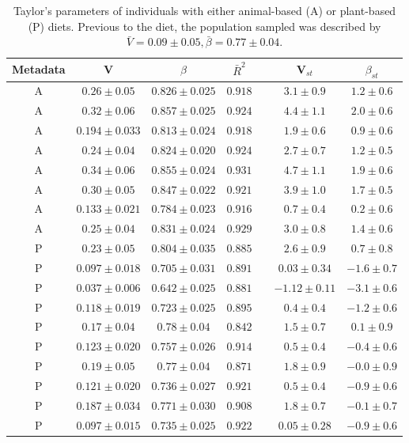 \documentclass[12pt,oneside,letterpaper]{article}
\begin{document}
\begin{table}
\caption{Taylor's parameters of individuals with either animal-based (A) or plant-based (P) diets\cite{diet}. Previous to the diet, the population sampled was described by $\bar{V} = 0.09 \pm 0.05, \bar{\beta} = 0.77 \pm 0.04$.}

  \begin{center}
    \begin{tabular}{*{7}{c}}
	    \hline
		Metadata&V&$\beta$&$\bar{R}^2$&&V$_{st}$&$\beta_{st}$\\
		\hline
		A&$0.26 \pm 0.05$&$0.826 \pm 0.025$&$0.918$&&$3.1 \pm 0.9$&$1.2 \pm 0.6$\\
		A&$0.32 \pm 0.06$&$0.857 \pm 0.025$&$0.924$&&$4.4 \pm 1.1$&$2.0 \pm 0.6$\\
		A&$0.194 \pm 0.033$&$0.813 \pm 0.024$&$0.918$&&$1.9 \pm 0.6$&$0.9 \pm 0.6$\\
		A&$0.24 \pm 0.04$&$0.824 \pm 0.020$&$0.924$&&$2.7 \pm 0.7$&$1.2 \pm 0.5$\\
		A&$0.34 \pm 0.06$&$0.855 \pm 0.024$&$0.931$&&$4.7 \pm 1.1$&$1.9 \pm 0.6$\\
		A&$0.30 \pm 0.05$&$0.847 \pm 0.022$&$0.921$&&$3.9 \pm 1.0$&$1.7 \pm 0.5$\\
		A&$0.133 \pm 0.021$&$0.784 \pm 0.023$&$0.916$&&$0.7 \pm 0.4$&$0.2 \pm 0.6$\\
		A&$0.25 \pm 0.04$&$0.831 \pm 0.024$&$0.929$&&$3.0 \pm 0.8$&$1.4 \pm 0.6$\\
		\hline
		P&$0.23 \pm 0.05$&$0.804 \pm 0.035$&$0.885$&&$2.6 \pm 0.9$&$0.7 \pm 0.8$\\
		P&$0.097 \pm 0.018$&$0.705 \pm 0.031$&$0.891$&&$0.03 \pm 0.34$&$-1.6 \pm 0.7$\\
		P&$0.037 \pm 0.006$&$0.642 \pm 0.025$&$0.881$&&$-1.12 \pm 0.11$&$-3.1 \pm 0.6$\\
		P&$0.118 \pm 0.019$&$0.723 \pm 0.025$&$0.895$&&$0.4 \pm 0.4$&$-1.2 \pm 0.6$\\
		P&$0.17 \pm 0.04$&$0.78 \pm 0.04$&$0.842$&&$1.5 \pm 0.7$&$0.1 \pm 0.9$\\
		P&$0.123 \pm 0.020$&$0.757 \pm 0.026$&$0.914$&&$0.5 \pm 0.4$&$-0.4 \pm 0.6$\\
		P&$0.19 \pm 0.05$&$0.77 \pm 0.04$&$0.871$&&$1.8 \pm 0.9$&$-0.0 \pm 0.9$\\
		P&$0.121 \pm 0.020$&$0.736 \pm 0.027$&$0.921$&&$0.5 \pm 0.4$&$-0.9 \pm 0.6$\\
		P&$0.187 \pm 0.034$&$0.771 \pm 0.030$&$0.908$&&$1.8 \pm 0.7$&$-0.1 \pm 0.7$\\
		P&$0.097 \pm 0.015$&$0.735 \pm 0.025$&$0.922$&&$0.05 \pm 0.28$&$-0.9 \pm 0.6$\\
	   	\hline
    	\hline
    \end{tabular}
  \end{center}
  \label{tab:diet}
\end{table}
\end{document}
